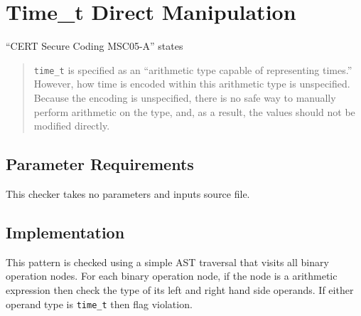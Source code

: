 %
%

\section{Time\_t Direct Manipulation}
\label{Time_tDirectManipulation::overview}

``CERT Secure Coding MSC05-A'' states
\begin{quote}
{\tt time\_t} is specified as an ``arithmetic type capable of representing times.'' However, how time is encoded within this arithmetic type is unspecified. Because the encoding is unspecified, there is no safe way to manually perform arithmetic on the type, and, as a result, the values should not be modified directly.
\end{quote}

\subsection{Parameter Requirements}
This checker takes no parameters and inputs source file.

\subsection{Implementation}
This pattern is checked using a simple AST traversal that visits all binary operation nodes. For each binary operation node, if the node is a arithmetic expression then check the type of its left and right hand side operands. If either operand type is {\tt time\_t} then flag violation.

